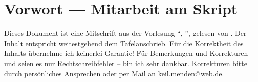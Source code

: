\section*{Vorwort --- Mitarbeit am Skript}
Dieses Dokument ist eine Mitschrift aus der Vorlesung \enquote{\fach, \Semester}, gelesen von \prof. Der Inhalt entspricht weitestgehend dem Tafelanschrieb. Für die
Korrektheit des Inhalts übernehme ich keinerlei Garantie! Für Bemerkungen und Korrekturen -- und seien es nur Rechtschreibfehler -- bin ich sehr dankbar. 
Korrekturen bitte durch persönliches Ansprechen oder per Mail an keil.menden@web.de.
	
	
